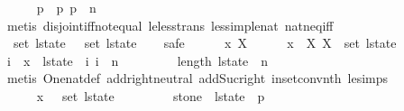 \begin{isabellebody}
\ \ \ \ \isamarkupfalse%
\ {\isacharbackquoteopen}p{}\ {\isacharless}\ p{}{\isacharbackquoteclose}\ {\isacharbackquoteopen}p{}\ {\isasymle}\ n{\isacharbackquoteclose}\isanewline
\ \ \ \ \isamarkupfalse%
\ {\isacharparenleft}metis\ disjoint{\isacharunderscore}iff{\isacharunderscore}not{\isacharunderscore}equal\ le{\isacharunderscore}less{\isacharunderscore}trans\ less{\isacharunderscore}imp{\isacharunderscore}le{\isacharunderscore}nat\ nat{\isacharunderscore}neq{\isacharunderscore}iff{\isacharparenright}\isanewline
\isanewline
\ \ \isamarkupfalse%
\ {\isachardoublequoteopen}{\isasymUnion}\ {\isacharparenleft}set\ l{\isacharunderscore}state{\isacharprime}{\isacharparenright}\ {\isacharequal}\ {\isasymUnion}\ {\isacharparenleft}set\ l{\isacharunderscore}state{\isacharparenright}{\isachardoublequoteclose}\isanewline
\ \ \isamarkupfalse%
\ safe\isanewline
\ \ \ \ \isamarkupfalse%
\ x\ X\isanewline
\ \ \ \ \isamarkupfalse%
\ {\isachardoublequoteopen}x\ {\isasymin}\ X{\isachardoublequoteclose}\ {\isachardoublequoteopen}X\ {\isasymin}\ set\ l{\isacharunderscore}state{\isacharprime}{\isachardoublequoteclose}\isanewline
\ \ \ \ \isamarkupfalse%
\ \isamarkupfalse%
\ i\ \ {\isachardoublequoteopen}x\ {\isasymin}\ l{\isacharunderscore}state{\isacharprime}\ {\isacharbang}\ i{\isachardoublequoteclose}\ {\isachardoublequoteopen}i\ {\isasymle}\ n{\isachardoublequoteclose}\ \isanewline
\ \ \ \ \ \ \isamarkupfalse%
\ {\isacharbackquoteopen}length\ l{\isacharunderscore}state{\isacharprime}\ {\isacharequal}\ n{\isacharplus}{}{\isacharbackquoteclose}\isanewline
\ \ \ \ \ \ \isamarkupfalse%
\ {\isacharparenleft}metis\ One{\isacharunderscore}nat{\isacharunderscore}def\ add{\isachardot}right{\isacharunderscore}neutral\ add{\isacharunderscore}Suc{\isacharunderscore}right\ in{\isacharunderscore}set{\isacharunderscore}conv{\isacharunderscore}nth\ le{\isacharunderscore}simps{\isacharparenleft}{}{\isacharparenright}{\isacharparenright}\isanewline
\ \ \ \ \ \ \isanewline
\ \ \ \ \isamarkupfalse%
\ {\isachardoublequoteopen}x\ {\isasymin}\ {\isasymUnion}\ {\isacharparenleft}set\ l{\isacharunderscore}state{\isacharparenright}{\isachardoublequoteclose}\isanewline
\ \ \ \ \ \ \isamarkupfalse%
\ {\isacharasterisk}\ {\isacharbackquoteopen}stone\ {\isasymin}\ l{\isacharunderscore}state\ {\isacharbang}\ p{}{\isacharbackquoteclose}\ {\isacharasterisk}{\isacharasterisk}\isanewline

\end{isabellebody}
